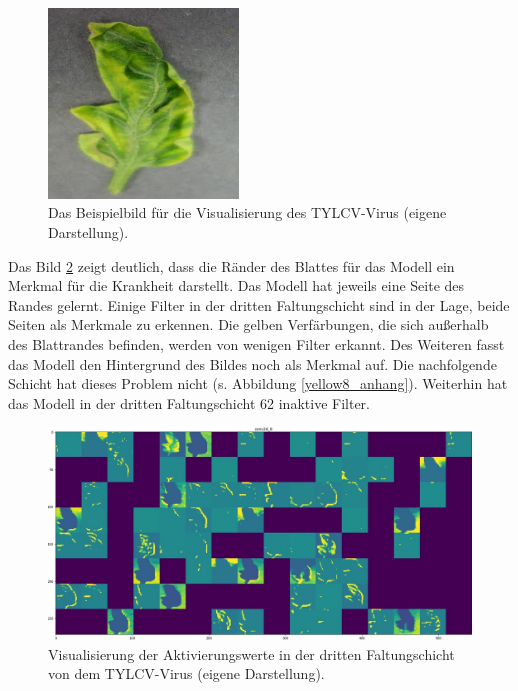 
\begin{figure}
	\centering
	\includegraphics[width=0.45\textwidth]{visualisierungen/yellow/yellow_sample.jpg}%
	\caption{Das Beispielbild für die Visualisierung des TYLCV-Virus (eigene Darstellung).}
	\label{yellow_sample}
\end{figure}


Das Bild \ref{yellow6_act_vis} zeigt deutlich, dass die Ränder des Blattes für das Modell ein Merkmal für die Krankheit darstellt. Das Modell hat jeweils eine Seite des Randes gelernt. Einige Filter in der dritten Faltungschicht sind in der Lage, beide Seiten als Merkmale zu erkennen. Die gelben Verfärbungen, die sich außerhalb des Blattrandes befinden, werden von wenigen Filter erkannt. Des Weiteren fasst das Modell den Hintergrund des Bildes noch als Merkmal auf. Die nachfolgende Schicht hat dieses Problem nicht (s. Abbildung \ref{yellow8_anhang}). Weiterhin hat das Modell in der dritten Faltungschicht 62 inaktive Filter.

\begin{figure}[h!]
	\centering
	\includegraphics[width=\textwidth]{visualisierungen/yellow/activation/yellow6.JPG}
	\caption{Visualisierung der Aktivierungswerte in der dritten Faltungschicht von dem TYLCV-Virus (eigene Darstellung).}
	\label{yellow6_act_vis}
\end{figure}

